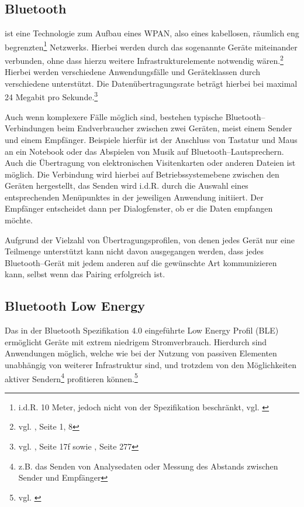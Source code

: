 \subsection{Bluetooth} %
\label{sub:bluetooth}

 ist eine Technologie zum Aufbau eines \ac{WPAN}, also eines kabellosen, räumlich eng begrenzten\footnote{i.d.R. 10 Meter, jedoch nicht von der Spezifikation beschränkt, vgl. \cite{bluetooth:smart}} Netzwerks. Hierbei werden durch das sogenannte  Geräte miteinander verbunden, ohne dass hierzu weitere Infrastrukturelemente notwendig wären.\footnote{vgl. \cite{bluetooth:spec}, Seite 1, 8} Hierbei werden verschiedene Anwendungsfälle und Geräteklassen durch verschiedene  unterstützt.  Die Datenübertragungsrate beträgt hierbei bei maximal 24 Megabit pro Sekunde.\footnote{vgl. \cite{bluetooth:sigv1}, Seite 17f sowie \cite{bluetooth:sigv3}, Seite 277}

Auch wenn komplexere Fälle möglich sind, bestehen typische Bluetooth–Verbindungen beim Endverbraucher zwischen zwei Geräten, meist einem Sender und einem Empfänger. Beispiele hierfür ist der Anschluss von Tastatur und Maus an ein Notebook oder das Abspielen von Musik auf Bluetooth–Lautsprechern. Auch die Übertragung von elektronischen Visitenkarten oder anderen Dateien ist möglich. Die Verbindung wird hierbei auf Betriebssystemebene zwischen den Geräten hergestellt, das Senden wird i.d.R. durch die Auswahl eines entsprechenden Menüpunktes in der jeweiligen Anwendung initiiert. Der Empfänger entscheidet dann per Dialogfenster, ob er die Daten empfangen möchte.

Aufgrund der Vielzahl von Übertragungsprofilen, von denen jedes Gerät nur eine Teilmenge unterstützt kann nicht davon ausgegangen werden, dass jedes Bluetooth–Gerät mit jedem anderen auf die gewünschte Art kommunizieren kann, selbst wenn das Pairing erfolgreich ist.

\subsection{Bluetooth Low Energy} %
\label{sub:bluetooth_low_energy}

Das in der Bluetooth Spezifikation 4.0 eingeführte Low Energy Profil (BLE) ermöglicht Geräte mit extrem niedrigem Stromverbrauch. Hierdurch sind Anwendungen möglich, welche wie bei der Nutzung von passiven Elementen unabhängig von weiterer Infrastruktur sind, und trotzdem von den Möglichkeiten aktiver Sendern\footnote{z.B. das Senden von Analysedaten oder Messung des Abstands zwischen Sender und Empfänger} profitieren können.\footnote{vgl. \cite{bluetooth:smart}}

